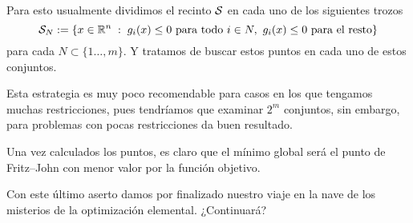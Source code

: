 Para esto usualmente dividimos el recinto $\mathcal{S}$ en cada uno de los siguientes trozos
\begin{equation*}
	\mathcal{S}_N:=\{x\in\mathbb{R}^n\;:\; g_i(x)\leq 0\text{ para todo }i\in N,\ g_i(x)\leq 0\text{ para el resto}\}
\end{equation*}
para cada $N\subset\{1\dots,m\}$. Y tratamos de buscar estos puntos en cada uno de estos conjuntos.

Esta estrategia es muy poco recomendable para casos en los que tengamos muchas restricciones, pues tendríamos que examinar $2^m$ conjuntos, sin embargo, para problemas con pocas restricciones da buen resultado.

Una vez calculados los puntos, es claro que el mínimo global será el punto de Fritz--John con menor valor por la función objetivo.

Con este último aserto damos por finalizado nuestro viaje en la nave de los misterios de la optimización elemental. ¿Continuará?